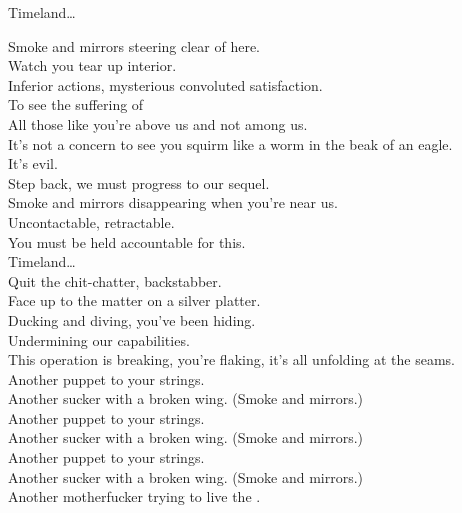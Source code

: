 
\label{album:made-in-timeland}




Timeland… \\




Smoke and mirrors steering clear of here. \\
Watch you tear up interior. \\
Inferior actions, mysterious convoluted satisfaction. \\
To see the suffering of \\
All those like you're above us and not among us. \\
It's not a concern to see you squirm like a worm in the beak of an eagle. \\
It's evil. \\
Step back, we must progress to our sequel. \\

Smoke and mirrors disappearing when you're near us. \\
Uncontactable, retractable. \\
You must be held accountable for this. \\

Timeland… \\

Quit the chit-chatter, backstabber. \\
Face up to the matter on a silver platter. \\
Ducking and diving, you've been hiding. \\
Undermining our capabilities. \\
This operation is breaking, you're flaking, it's all unfolding at the seams. \\

Another puppet to your strings. \\
Another sucker with a broken wing. (Smoke and mirrors.) \\
Another puppet to your strings. \\
Another sucker with a broken wing. (Smoke and mirrors.) \\
Another puppet to your strings. \\
Another sucker with a broken wing. (Smoke and mirrors.) \\
Another motherfucker trying to live the . \\
